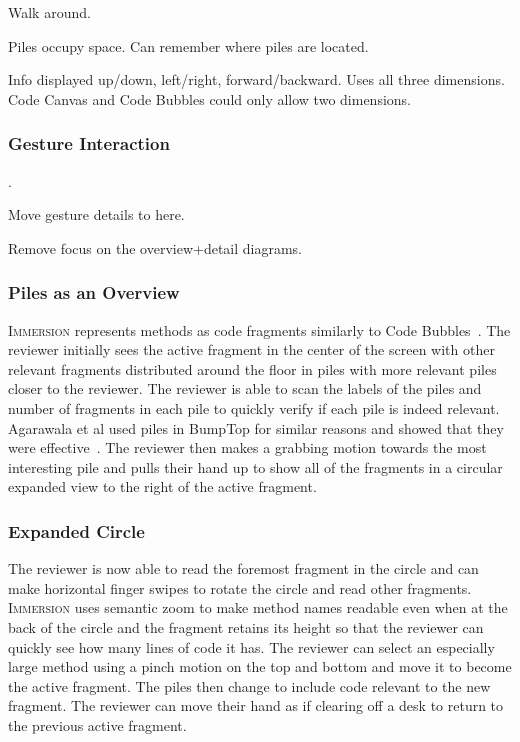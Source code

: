 \documentclass[conference]{IEEEtran}
\begin{document}
Walk around.

Piles occupy space.
Can remember where piles are located. 

Info displayed up/down, left/right, forward/backward.
Uses all three dimensions. 
Code Canvas and Code Bubbles could only allow two dimensions.

\subsubsection{Gesture Interaction}.

Move gesture details to here.

Remove focus on the overview+detail diagrams.

\subsubsection{Piles as an Overview}
\textsc{Immersion} represents methods as code fragments similarly to Code Bubbles~\cite{Bragdon:CodeBubbles}.  
The reviewer initially sees the active fragment in the center of the screen with other relevant fragments distributed around the floor in piles with more relevant piles closer to the reviewer. 
The reviewer is able to scan the labels of the piles and number of fragments in each pile to quickly verify if each pile is indeed relevant.
Agarawala et al used piles in BumpTop for similar reasons and showed that they were effective~\cite{Agarawala:BumpTop}.
The reviewer then makes a grabbing motion towards the most interesting pile and pulls their hand up to show all of the fragments in a circular expanded view to the right of the active fragment.

\subsubsection{Expanded Circle}
The reviewer is now able to read the foremost fragment in the circle and can make horizontal finger swipes to rotate the circle and read other fragments. 
\textsc{Immersion} uses semantic zoom to make method names readable even when at the back of the circle and the fragment retains its height so that the reviewer can quickly see how many lines of code it has. 
The reviewer can select an especially large method using a pinch motion on the top and bottom and move it to become the active fragment. 
The piles then change to include code relevant to the new fragment. 
The reviewer can move their hand as if clearing off a desk to return to the previous active fragment.
\end{document}
